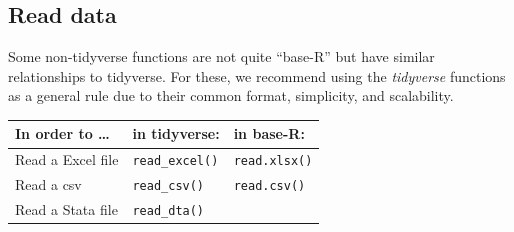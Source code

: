 \documentclass[
]{book}
\theoremstyle{definition}
\theoremstyle{definition}
\theoremstyle{definition}
\theoremstyle{definition}
\theoremstyle{remark}
\begin{document}
\hypertarget{read-data}{%
\subsection*{Read data}\label{read-data}}

Some non-tidyverse functions are not quite ``base-R'' but have similar relationships to tidyverse. For these, we recommend using the \emph{tidyverse} functions as a general rule due to their common format, simplicity, and scalability.

\begin{longtable}[]{@{}lll@{}}
\toprule
\begin{minipage}[b]{0.29\columnwidth}\raggedright
In order to \ldots{}\strut
\end{minipage} & \begin{minipage}[b]{0.33\columnwidth}\raggedright
in tidyverse:\strut
\end{minipage} & \begin{minipage}[b]{0.30\columnwidth}\raggedright
in base-R:\strut
\end{minipage}\tabularnewline
\midrule
\endhead
\begin{minipage}[t]{0.29\columnwidth}\raggedright
Read a Excel file\strut
\end{minipage} & \begin{minipage}[t]{0.33\columnwidth}\raggedright
\texttt{read\_excel()}\strut
\end{minipage} & \begin{minipage}[t]{0.30\columnwidth}\raggedright
\texttt{read.xlsx()}\strut
\end{minipage}\tabularnewline
\begin{minipage}[t]{0.29\columnwidth}\raggedright
Read a csv\strut
\end{minipage} & \begin{minipage}[t]{0.33\columnwidth}\raggedright
\texttt{read\_csv()}\strut
\end{minipage} & \begin{minipage}[t]{0.30\columnwidth}\raggedright
\texttt{read.csv()}\strut
\end{minipage}\tabularnewline
\begin{minipage}[t]{0.29\columnwidth}\raggedright
Read a Stata file\strut
\end{minipage} & \begin{minipage}[t]{0.33\columnwidth}\raggedright
\texttt{read\_dta()}\strut
\end{minipage} & \begin{minipage}[t]{0.30\columnwidth}\raggedright

\end{minipage}
\end{longtable}
\end{document}
